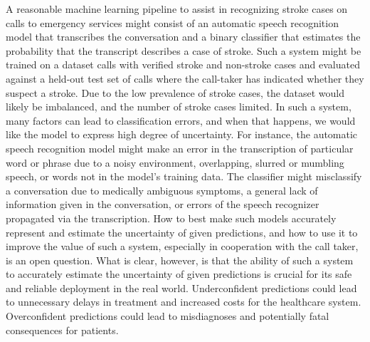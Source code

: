 A reasonable machine learning pipeline to assist in recognizing stroke cases on calls to emergency services might consist of an automatic speech recognition model that transcribes the conversation and a binary classifier that estimates the probability that the transcript describes a case of stroke. 
Such a system might be trained on a dataset calls with verified stroke and non-stroke cases and evaluated against a held-out test set of calls where the call-taker has indicated whether they suspect a stroke. Due to the low prevalence of stroke cases, the dataset would likely be imbalanced, and the number of stroke cases limited. 
In such a system, many factors can lead to classification errors, and when that happens, we would like the model to express high degree of uncertainty. 
For instance, the automatic speech recognition model might make an error in the transcription of particular word or phrase due to a noisy environment, overlapping, slurred or mumbling speech, or words not in the model's training data. 
The classifier might misclassify a conversation due to medically ambiguous symptoms, a general lack of information given in the conversation, or errors of the speech recognizer propagated via the transcription. 
How to best make such models accurately represent and estimate the uncertainty of given predictions, and how to use it to improve the value of such a system, especially in cooperation with the call taker, is an open question.
What is clear, however, is that the ability of such a system to accurately estimate the uncertainty of given predictions is crucial for its safe and reliable deployment in the real world. Underconfident predictions could lead to unnecessary delays in treatment and increased costs for the healthcare system. Overconfident predictions could lead to misdiagnoses and potentially fatal consequences for patients.


